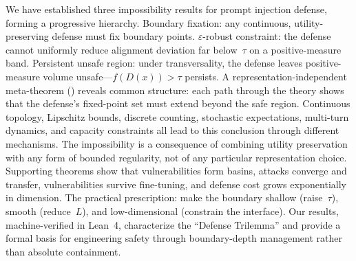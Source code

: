 \documentclass[11pt]{article}
\begin{document}
We have established three impossibility results for prompt injection
defense, forming a progressive hierarchy. Boundary fixation:
any continuous, utility-preserving defense must fix boundary points.
$\varepsilon$-robust constraint: the defense cannot uniformly
reduce alignment deviation far below~$\tau$ on a positive-measure band.
Persistent unsafe region: under transversality, the defense
leaves positive-measure volume unsafe---$f(D(x)) > \tau$
persists. A representation-independent meta-theorem ()
reveals common structure: each path through the theory shows that
the defense's fixed-point set must extend beyond the safe region.
Continuous topology, Lipschitz bounds, discrete counting, stochastic
expectations, multi-turn dynamics, and capacity constraints all lead
to this conclusion through different mechanisms.
The impossibility is a consequence of combining utility preservation
with any form of bounded regularity, not of any particular
representation choice.
Supporting theorems show that vulnerabilities form
basins, attacks converge and transfer, vulnerabilities survive
fine-tuning, and defense cost grows exponentially in dimension. The
practical prescription: make the boundary shallow (raise~$\tau$),
smooth (reduce~$L$), and low-dimensional (constrain the interface).
Our results, machine-verified in Lean~4, characterize the ``Defense
Trilemma'' and provide a formal basis for engineering safety through
boundary-depth management rather than absolute containment.
\end{document}
